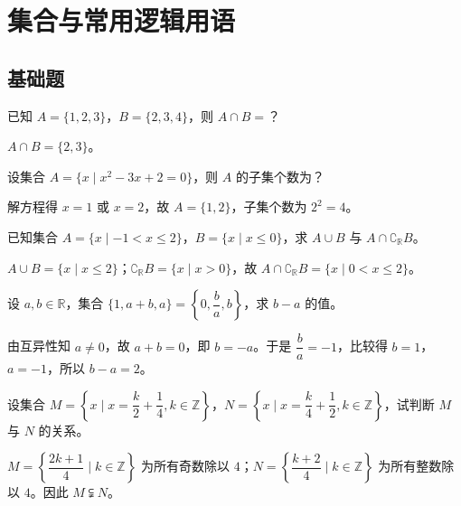 \chapter{集合与常用逻辑用语}

\section{基础题}

\begin{problem}
已知 $A=\{1,2,3\}$，$B=\{2,3,4\}$，则 $A\cap B=$？
\end{problem}
\begin{solution}
$A\cap B=\{2,3\}$。
\end{solution}

\begin{problem}
设集合 $A=\{x\mid x^2-3x+2=0\}$，则 $A$ 的子集个数为？
\end{problem}
\begin{solution}
解方程得 $x=1$ 或 $x=2$，故 $A=\{1,2\}$，子集个数为 $2^2=4$。
\end{solution}

\begin{problem}
已知集合 $A=\{x\mid -1<x\le 2\}$，$B=\{x\mid x\le 0\}$，求 $A\cup B$ 与 $A\cap \complement_{\mathbb{R}}B$。
\end{problem}
\begin{solution}
$A\cup B=\{x\mid x\le 2\}$；$\complement_{\mathbb{R}}B=\{x\mid x>0\}$，故 $A\cap\complement_{\mathbb{R}}B=\{x\mid 0<x\le 2\}$。
\end{solution}

\begin{problem}
设 $a,b\in\mathbb{R}$，集合 $\{1,a+b,a\}=\left\{0,\dfrac{b}{a},b\right\}$，求 $b-a$ 的值。
\end{problem}
\begin{solution}
由互异性知 $a\ne 0$，故 $a+b=0$，即 $b=-a$。于是 $\dfrac{b}{a}=-1$，比较得 $b=1$，$a=-1$，所以 $b-a=2$。
\end{solution}

\begin{problem}
设集合 $M=\left\{x\mid x=\dfrac{k}{2}+\dfrac{1}{4},k\in\mathbb{Z}\right\}$，$N=\left\{x\mid x=\dfrac{k}{4}+\dfrac{1}{2},k\in\mathbb{Z}\right\}$，试判断 $M$ 与 $N$ 的关系。
\end{problem}
\begin{solution}
$M=\left\{\dfrac{2k+1}{4}\mid k\in\mathbb{Z}\right\}$ 为所有奇数除以 $4$；$N=\left\{\dfrac{k+2}{4}\mid k\in\mathbb{Z}\right\}$ 为所有整数除以 $4$。因此 $M\subsetneqq N$。
\end{solution}


